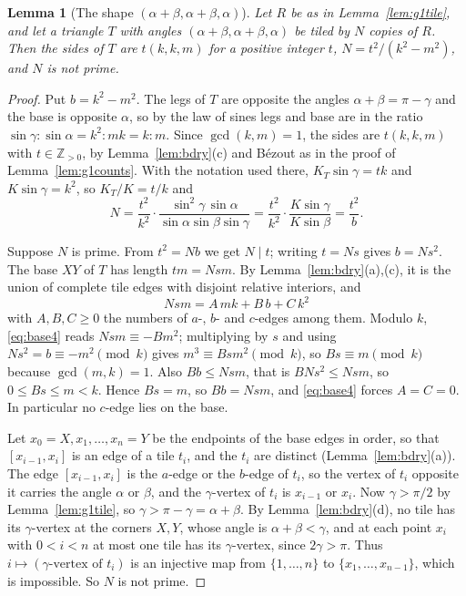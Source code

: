 \documentclass[11pt]{amsart}
\newtheorem{lemma}[theorem]{Lemma}
\theoremstyle{remark}
\newcommand{\Z}{\mathbb{Z}}
\begin{document}
\begin{lemma}[The shape $(\alpha+\beta,\alpha+\beta,\alpha)$]\label{lem:shape4}
Let $R$ be as in Lemma~\ref{lem:g1tile}, and let a triangle $T$ with angles $(\alpha+\beta,\alpha+\beta,\alpha)$ be tiled by $N$ copies of $R$. Then the sides of $T$ are $t(k,k,m)$ for a positive integer $t$, $N=t^2/(k^2-m^2)$, and $N$ is not prime.
\end{lemma}

\begin{proof}
Put $b=k^2-m^2$. The legs of $T$ are opposite the angles $\alpha+\beta=\pi-\gamma$ and the base is opposite $\alpha$, so by the law of sines legs and base are in the ratio $\sin\gamma:\sin\alpha=k^2:mk=k:m$. Since $\gcd(k,m)=1$, the sides are $t(k,k,m)$ with $t\in\Z_{>0}$, by Lemma~\ref{lem:bdry}(c) and B\'ezout as in the proof of Lemma~\ref{lem:g1counts}. With the notation used there, $K_T\sin\gamma=tk$ and $K\sin\gamma=k^2$, so $K_T/K=t/k$ and
\[
N=\frac{t^2}{k^2}\cdot\frac{\sin^2\gamma\,\sin\alpha}{\sin\alpha\sin\beta\sin\gamma}
=\frac{t^2}{k^2}\cdot\frac{K\sin\gamma}{K\sin\beta}=\frac{t^2}{b}.
\]

Suppose $N$ is prime. From $t^2=Nb$ we get $N\mid t$; writing $t=Ns$ gives $b=Ns^2$. The base $XY$ of $T$ has length $tm=Nsm$. By Lemma~\ref{lem:bdry}(a),(c), it is the union of complete tile edges with disjoint relative interiors, and
\begin{equation}\label{eq:base4}
Nsm=A\,mk+B\,b+C\,k^2
\end{equation}
with $A,B,C\ge0$ the numbers of $a$-, $b$- and $c$-edges among them. Modulo $k$, \eqref{eq:base4} reads $Nsm\equiv-Bm^2$; multiplying by $s$ and using $Ns^2=b\equiv-m^2\pmod k$ gives $m^3\equiv Bsm^2\pmod k$, so $Bs\equiv m\pmod k$ because $\gcd(m,k)=1$. Also $Bb\le Nsm$, that is $BNs^2\le Nsm$, so $0\le Bs\le m<k$. Hence $Bs=m$, so $Bb=Nsm$, and \eqref{eq:base4} forces $A=C=0$. In particular no $c$-edge lies on the base.

Let $x_0=X,x_1,\dots,x_n=Y$ be the endpoints of the base edges in order, so that $[x_{i-1},x_i]$ is an edge of a tile $t_i$, and the $t_i$ are distinct (Lemma~\ref{lem:bdry}(a)). The edge $[x_{i-1},x_i]$ is the $a$-edge or the $b$-edge of $t_i$, so the vertex of $t_i$ opposite it carries the angle $\alpha$ or $\beta$, and the $\gamma$-vertex of $t_i$ is $x_{i-1}$ or $x_i$. Now $\gamma>\pi/2$ by Lemma~\ref{lem:g1tile}, so $\gamma>\pi-\gamma=\alpha+\beta$. By Lemma~\ref{lem:bdry}(d), no tile has its $\gamma$-vertex at the corners $X,Y$, whose angle is $\alpha+\beta<\gamma$, and at each point $x_i$ with $0<i<n$ at most one tile has its $\gamma$-vertex, since $2\gamma>\pi$. Thus $i\mapsto(\text{$\gamma$-vertex of }t_i)$ is an injective map from $\{1,\dots,n\}$ to $\{x_1,\dots,x_{n-1}\}$, which is impossible. So $N$ is not prime.
\end{proof}
\end{document}
